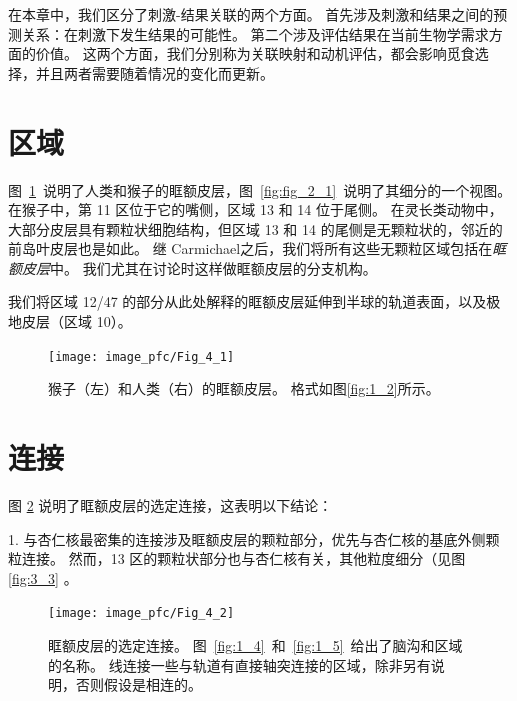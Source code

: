 在本章中，我们区分了刺激-结果关联的两个方面。
首先涉及刺激和结果之间的预测关系：在刺激下发生结果的可能性。
第二个涉及评估结果在当前生物学需求方面的价值。
这两个方面，我们分别称为关联映射和动机评估，都会影响觅食选择，并且两者需要随着情况的变化而更新。\par



\section{区域}

图~\ref{fig:fig_4_1}~说明了人类和猴子的眶额皮层，图~\ref{fig:fig_2_1}~说明了其细分的一个视图。
在猴子中，第 11 区位于它的嘴侧，区域 13 和 14 位于尾侧\cite{walker1940cytoarchitectural}。
在灵长类动物中，大部分皮层具有颗粒状细胞结构，但区域 13 和 14 的尾侧是无颗粒状的，邻近的前岛叶皮层也是如此。
继 Carmichael\cite{carmichael1994architectonic}之后，我们将所有这些无颗粒区域包括在\textit{眶额皮层}中。
我们尤其在讨论时这样做眶额皮层的分支机构。\par


我们将区域 12/47 的部分从此处解释的眶额皮层延伸到半球的轨道表面，以及极地皮层（区域 10）。


\begin{figure}[!htb]
	\centering
	\texttt{[image: image\_pfc/Fig\_4\_1]}
	\caption{猴子（左）和人类（右）的眶额皮层。 
		格式如图\ref{fig:1_2}所示。}\label{fig:fig_4_1}
\end{figure}



\section{连接}

图 \ref{fig:fig_4_2} 说明了眶额皮层的选定连接，这表明以下结论：\par


1. 与杏仁核最密集的连接涉及眶额皮层的颗粒部分，优先与杏仁核的基底外侧颗粒连接。
然而，13 区的颗粒状部分也与杏仁核有关，其他粒度细分（见图\ref{fig:3_3}
\cite{carmichael1995limbic}。\par


\begin{figure}[!htb]
	\centering
	\texttt{[image: image\_pfc/Fig\_4\_2]}
	\caption{眶额皮层的选定连接。
		图~\ref{fig:1_4}~和~\ref{fig:1_5}~给出了脑沟和区域的名称。
		线连接一些与轨道有直接轴突连接的区域，除非另有说明，否则假设是相连的。}\label{fig:fig_4_2}
\end{figure}


